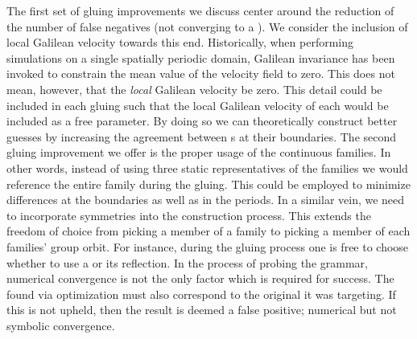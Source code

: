 The first set of gluing improvements we discuss center around the reduction of
the number of false negatives (not converging to a {\po}). We consider
the inclusion of local Galilean velocity towards this end. Historically,
when performing simulations on a single spatially periodic domain,
Galilean invariance has been invoked to constrain the mean value of
the velocity field to zero. This does not mean, however, that the \emph{local}
Galilean velocity be zero. This detail could be included in each gluing such that the
local Galilean velocity of each {\fpo} would be included as a free parameter. By
doing so we can theoretically construct better guesses by increasing the
agreement between {\fpo}s at their boundaries.
The second gluing improvement we offer is the proper usage of the {\fpo} continuous families.
In other words, instead of using three static representatives of the families
we would reference the entire family during the gluing. This could be employed to
minimize differences at the
boundaries as well as in the periods.
In a similar vein, we need to incorporate symmetries into the construction process.
This extends the freedom of choice from picking a member of a family to
picking a member of each families' group orbit. For instance, during the gluing
process one is free to choose whether to use a {\fpo} or its reflection.
In the process of probing the {\symbolic} grammar, numerical convergence is not
the only factor which is required for success. The {\po} found via optimization
must also correspond to the original {\brick} it was targeting. If this is not
upheld, then the result is deemed a false positive; numerical but not symbolic
convergence.


